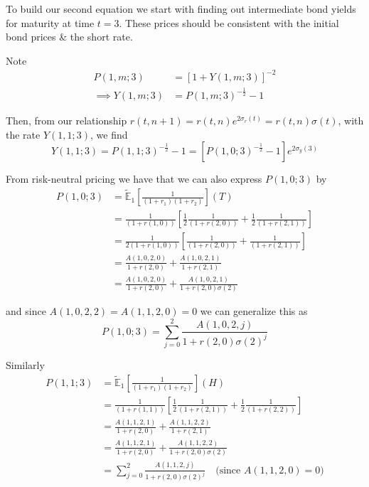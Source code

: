 \documentclass[12pt]{article}
\newlength\tindent
\renewcommand{\indent}{\hspace*{\tindent}}
\newcommand{\E}{\mathbb E}
\begin{document}
\indent To build our second equation we start with finding out intermediate bond yields for maturity at time $t = 3$. These prices should be consistent with the initial bond prices \& the short rate.

Note 
\begin{align*}
	P(1,m;3) &= [1 + Y(1,m;3)]^{-2} \\
	\implies Y(1,m;3) &= P(1,m;3)^{-\frac{1}{2}} - 1
\end{align*}

Then, from our relationship $r(t, n + 1) = r(t,n)e^{2\sigma_r(t)} = r(t,n)\sigma(t)$, with the rate $Y(1,1;3)$, we find
\begin{equation*}
	Y(1,1;3) = P(1,1;3)^{-\frac{1}{2}} - 1 = \left[ P(1,0;3)^{-\frac{1}{2}} - 1\right] e^{2\sigma_y(3)}
\end{equation*}

From risk-neutral pricing we have that we can also express $P(1,0;3)$ by
\begin{align*}
	P(1,0;3) &= \tilde{\E}_1 \left[ \frac{1}{(1 + r_1)(1 + r_2)} \right](T) \\
	&= \frac{1}{(1 + r(1,0))} \left[ \frac{1}{2} \frac{1}{( 1 + r(2,0) )} + \frac{1}{2} \frac{1}{(1 + r(2,1))} \right] \\
	&= \frac{1}{2(1 + r(1,0))} \left[ \frac{1}{( 1 + r(2,0) )} + \frac{1}{(1 + r(2,1))} \right] \\
	&= \frac{ A(1,0,2,0) }{ 1 + r(2,0) } + \frac{ A(1,0,2,1) }{ 1 + r(2,1) } \\
	&= \frac{ A(1,0,2,0) }{ 1 + r(2,0) } + \frac{ A(1,0,2,1) }{ 1 + r(2,0)\sigma(2) }
\end{align*}

and since $A(1,0,2,2) = A(1,1,2,0) = 0$ we can generalize this as
\begin{equation*}
	P(1,0;3) = \sum^2_{j = 0} \frac{ A(1,0,2,j) }{ 1 + r(2,0)\sigma(2)^j }
\end{equation*}

Similarly
\begin{align*}
	P(1,1;3) &= \tilde{\E}_1 \left[ \frac{1}{(1 + r_1)(1 + r_2)} \right](H) \\
	&= \frac{1}{(1 + r(1,1))} \left[ \frac{1}{2} \frac{1}{( 1 + r(2,1) )} + \frac{1}{2} \frac{1}{(1 + r(2,2))} \right] \\
	&= \frac{ A(1,1,2,1) }{ 1 + r(2,0) } + \frac{ A(1,1,2,2) }{ 1 + r(2,1) } \\
	&= \frac{ A(1,1,2,1) }{ 1 + r(2,0) } + \frac{ A(1,1,2,2) }{ 1 + r(2,0)\sigma(2) } \\
	&= \sum^2_{j = 0} \frac{ A(1,1,2,j) }{ 1 + r(2,0)\sigma(2)^j } \quad \text{(since $A(1,1,2,0) = 0$)}
\end{align*}
\end{document}
